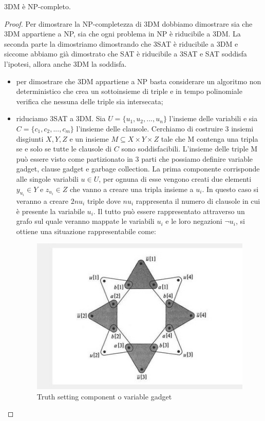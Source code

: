 \begin{theorem}
    3DM è NP-completo.
\end{theorem}
\begin{proof}
    Per dimostrare la NP-completezza di 3DM dobbiamo dimostrare sia che 3DM appartiene a NP, sia che ogni problema in NP è riducibile a 3DM. 
    La seconda parte la dimostriamo dimostrando che 3SAT è riducibile a 3DM e siccome abbiamo già dimostrato che SAT è riducibile a 3SAT e SAT soddisfa l'ipotesi, allora anche 3DM la soddisfa. 
    \begin{itemize}
        \item per dimostrare che 3DM appartiene a NP basta considerare un algoritmo non deterministico che crea un sottoinsieme di triple e in tempo polinomiale verifica che nessuna delle triple sia intersecata;
        \item riduciamo 3SAT a 3DM. Sia $U=\{u_1,u_2,...,u_n\}$ l'insieme delle variabili e sia $C=\{c_1,c_2,...,c_m\}$ l'insieme delle clausole.
        Cerchiamo di costruire 3 insiemi disgiunti $X,Y,Z$ e un insieme $M \subseteq X \times Y \times Z$ tale che M contenga una tripla se e solo se tutte le clausole di $C$ sono soddisfacibili.
        L'insieme delle triple M può essere visto come partizionato in 3 parti che possiamo definire variable gadget, clause gadget e garbage collection. La prima componente corrisponde alle singole variabili $u\in U$, per ognuna di esse vengono creati due elementi $y_{u_i}\in Y$ e $z_{u_i} \in Z$ che vanno a creare una tripla insieme a $u_i$. In questo caso si veranno a creare $2nu_i$ triple dove $nu_i$ rappresenta il numero di clausole in cui è presente la variabile $u_i$. Il tutto può essere rappresentato attraverso un grafo sul quale veranno mappate le variabili $u_i$ e le loro negazioni $\lnot u_i$, si ottiene una situazione rappresentabile come: 
        \begin{figure}[H]
            \centering
            \includegraphics[width=0.5\linewidth]{variablegadget.jpeg}
            \caption{Truth setting component o variable gadget}
            \label{fig:enter-label}

\end{figure}
\end{itemize}
\end{proof}
